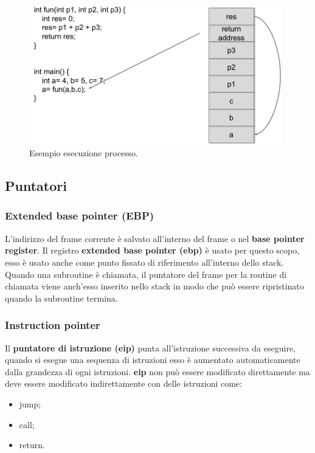 \begin{figure}[H]
    \centering
    \includegraphics[width=11cm, keepaspectratio]{capitoli/secure_coding/img/cap_2/es_esecuzione_processo.png}
    \caption{Esempio esecuzione processo.}\label{fig:es_esec_processo}
\end{figure}

\subsection{Puntatori}

\subsubsection{Extended base pointer (EBP)}

L'indirizzo del frame corrente è salvato all'interno del frame o
nel \textbf{base pointer register}.
Il registro \textbf{extended base pointer (ebp) } è usato per questo scopo, esso è
usato anche come punto fissato di riferimento all'interno dello stack. Quando una
subroutine è chiamata, il puntatore del frame per la routine di chiamata viene anch'esso
inserito nello stack in modo che può essere ripristinato quando la subroutine termina.

\subsubsection{Instruction pointer}

Il \textbf{puntatore di istruzione (eip)} punta all'istruzione successiva da eseguire,
quando si esegue una sequenza di istruzioni esso è aumentato automaticamente dalla
grandezza di ogni istruzioni. \textbf{eip} non può essere modificato direttamente ma deve
essere modificato indirettamente con delle istruzioni come:

\begin{itemize}
    \item jump;
    \item call;
    \item return.
\end{itemize}

